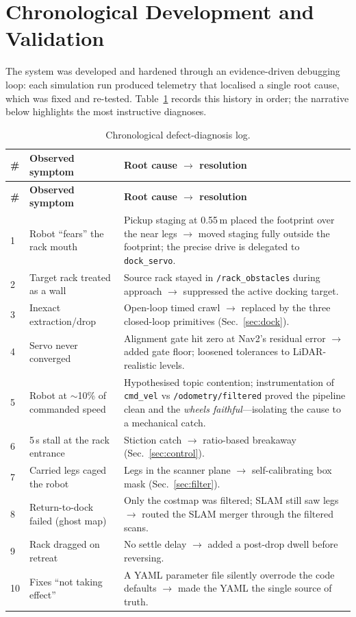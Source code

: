 \documentclass[11pt,a4paper]{article}
\newcommand{\code}[1]{\texttt{\small #1}}
\begin{document}
\section{Chronological Development and Validation}\label{sec:chrono}
The system was developed and hardened through an evidence-driven debugging
loop: each simulation run produced telemetry that localised a single root
cause, which was fixed and re-tested. Table~\ref{tab:chrono} records this
history in order; the narrative below highlights the most instructive
diagnoses.

\begin{longtable}{@{}p{0.5cm}p{5.2cm}p{8.6cm}@{}}
\caption{Chronological defect-diagnosis log.}\label{tab:chrono}\\
\toprule
\textbf{\#} & \textbf{Observed symptom} & \textbf{Root cause $\rightarrow$ resolution}\\
\midrule
\endfirsthead
\toprule
\textbf{\#} & \textbf{Observed symptom} & \textbf{Root cause $\rightarrow$ resolution}\\
\midrule
\endhead
1 & Robot ``fears'' the rack mouth & Pickup staging at 0.55\,m placed the
 footprint over the near legs $\rightarrow$ moved staging fully outside the
 footprint; the precise drive is delegated to \code{dock\_servo}.\\
2 & Target rack treated as a wall & Source rack stayed in \code{/rack\_obstacles}
 during approach $\rightarrow$ suppressed the active docking target.\\
3 & Inexact extraction/drop & Open-loop timed crawl $\rightarrow$ replaced by the
 three closed-loop primitives (Sec.~\ref{sec:dock}).\\
4 & Servo never converged & Alignment gate hit zero at Nav2's residual error
 $\rightarrow$ added gate floor; loosened tolerances to LiDAR-realistic levels.\\
5 & Robot at $\sim$10\% of commanded speed & Hypothesised topic contention;
 instrumentation of \code{cmd\_vel} vs \code{/odometry/filtered} proved the
 pipeline clean and the \emph{wheels faithful}---isolating the cause to a
 mechanical catch.\\
6 & 5\,s stall at the rack entrance & Stiction catch $\rightarrow$ ratio-based
 breakaway (Sec.~\ref{sec:control}).\\
7 & Carried legs caged the robot & Legs in the scanner plane $\rightarrow$
 self-calibrating box mask (Sec.~\ref{sec:filter}).\\
8 & Return-to-dock failed (ghost map) & Only the costmap was filtered; SLAM
 still saw legs $\rightarrow$ routed the SLAM merger through the filtered scans.\\
9 & Rack dragged on retreat & No settle delay $\rightarrow$ added a post-drop
 dwell before reversing.\\
10 & Fixes ``not taking effect'' & A YAML parameter file silently overrode the
 code defaults $\rightarrow$ made the YAML the single source of truth.\\
\bottomrule
\end{longtable}
\end{document}
